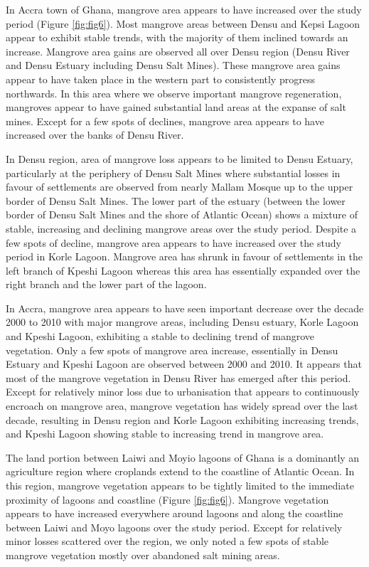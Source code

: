 \documentclass[12pt,oneside,preprint,3p,authoryear,times]{elsarticle} %
\begin{document}
In Accra town of Ghana, mangrove area appears to have increased over the
study period (Figure \ref{fig:fig6}). Most mangrove areas between Densu
and Kepsi Lagoon appear to exhibit stable trends, with the majority of
them inclined towards an increase. Mangrove area gains are observed all
over Densu region (Densu River and Densu Estuary including Densu Salt
Mines). These mangrove area gains appear to have taken place in the
western part to consistently progress northwards. In this area where we
observe important mangrove regeneration, mangroves appear to have gained
substantial land areas at the expanse of salt mines. Except for a few
spots of declines, mangrove area appears to have increased over the
banks of Densu River.

In Densu region, area of mangrove loss appears to be limited to Densu
Estuary, particularly at the periphery of Densu Salt Mines where
substantial losses in favour of settlements are observed from nearly
Mallam Mosque up to the upper border of Densu Salt Mines. The lower part
of the estuary (between the lower border of Densu Salt Mines and the
shore of Atlantic Ocean) shows a mixture of stable, increasing and
declining mangrove areas over the study period. Despite a few spots of
decline, mangrove area appears to have increased over the study period
in Korle Lagoon. Mangrove area has shrunk in favour of settlements in
the left branch of Kpeshi Lagoon whereas this area has essentially
expanded over the right branch and the lower part of the lagoon.

In Accra, mangrove area appears to have seen important decrease over the
decade 2000 to 2010 with major mangrove areas, including Densu estuary,
Korle Lagoon and Kpeshi Lagoon, exhibiting a stable to declining trend
of mangrove vegetation. Only a few spots of mangrove area increase,
essentially in Densu Estuary and Kpeshi Lagoon are observed between 2000
and 2010. It appears that most of the mangrove vegetation in Densu River
has emerged after this period. Except for relatively minor loss due to
urbanisation that appears to continuously encroach on mangrove area,
mangrove vegetation has widely spread over the last decade, resulting in
Densu region and Korle Lagoon exhibiting increasing trends, and Kpeshi
Lagoon showing stable to increasing trend in mangrove area.

The land portion between Laiwi and Moyio lagoons of Ghana is a
dominantly an agriculture region where croplands extend to the coastline
of Atlantic Ocean. In this region, mangrove vegetation appears to be
tightly limited to the immediate proximity of lagoons and coastline
(Figure \ref{fig:fig6}). Mangrove vegetation appears to have increased
everywhere around lagoons and along the coastline between Laiwi and Moyo
lagoons over the study period. Except for relatively minor losses
scattered over the region, we only noted a few spots of stable mangrove
vegetation mostly over abandoned salt mining areas.
\end{document}
